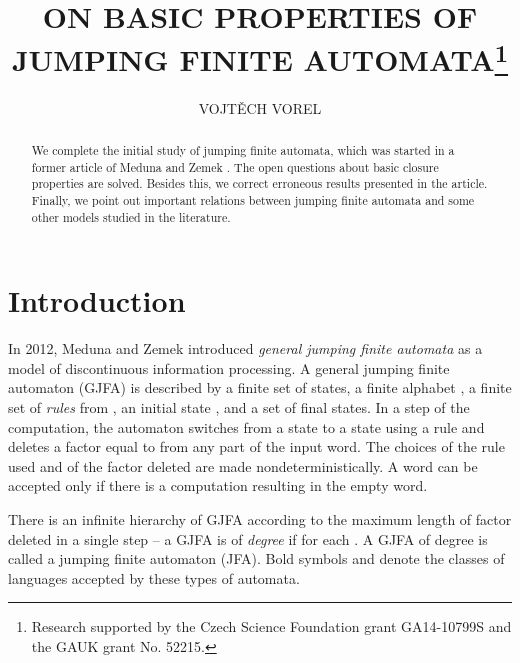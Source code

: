 \documentclass{ws-ijmpc}
\begin{document}
\title{\uppercase{On Basic Properties of Jumping Finite Automata}\footnote{Research supported by the Czech Science Foundation grant GA14-10799S and the GAUK grant No. 52215.}}

\author{\uppercase{Vojt\v{e}ch Vorel}}
\address{Department of Theoretical Computer Science and Mathematical Logic,\\
Charles University,\\ Malostransk\'{e} n\'{a}m. 25, Prague, Czech Republic\\ vorel@ktiml.mff.cuni.cz}

\maketitle

\begin{abstract} We complete the initial study of jumping finite automata, which was started in a former article of Meduna and Zemek \citep{athMED1}. The open questions about basic closure properties are solved. Besides this, we correct erroneous results presented in the article. Finally, we point out important relations between jumping finite automata and some other models studied in the literature. \end{abstract}



\section{Introduction}

In 2012, Meduna and Zemek \citep{athMED1} introduced \emph{general
jumping finite automata} as a model of discontinuous information processing.
A general jumping finite automaton (GJFA) is described by a finite
set  of states, a finite alphabet , a finite set 
of \emph{rules }from , an initial state
, and a set  of final states. In a step of
the computation, the automaton switches from a state  to a state
 using a rule  and deletes a factor
equal to  from any part of the input word. The choices of the
rule used and of the factor deleted are made nondeterministically.
A word can be accepted only if there is a computation resulting in
the empty word.

There is an infinite hierarchy of GJFA according to the maximum length
of factor deleted in a single step -- a GJFA is of \emph{degree} 
if  for each . A GJFA
of degree  is called a jumping finite automaton\emph{ }(JFA).
Bold symbols  and  denote the classes
of languages accepted by these types of automata. 
\end{document}
